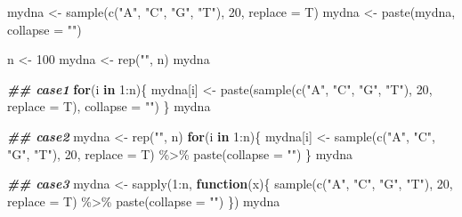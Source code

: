 \documentclass[
]{book}
\newenvironment{Shaded}{\begin{snugshade}}{\end{snugshade}}
\newcommand{\AttributeTok}[1]{\textcolor[rgb]{0.77,0.63,0.00}{#1}}
\newcommand{\ControlFlowTok}[1]{\textcolor[rgb]{0.13,0.29,0.53}{\textbf{#1}}}
\newcommand{\DecValTok}[1]{\textcolor[rgb]{0.00,0.00,0.81}{#1}}
\newcommand{\DocumentationTok}[1]{\textcolor[rgb]{0.56,0.35,0.01}{\textbf{\textit{#1}}}}
\newcommand{\FunctionTok}[1]{\textcolor[rgb]{0.00,0.00,0.00}{#1}}
\newcommand{\NormalTok}[1]{#1}
\newcommand{\OtherTok}[1]{\textcolor[rgb]{0.56,0.35,0.01}{#1}}
\newcommand{\SpecialCharTok}[1]{\textcolor[rgb]{0.00,0.00,0.00}{#1}}
\newcommand{\StringTok}[1]{\textcolor[rgb]{0.31,0.60,0.02}{#1}}
\begin{document}
\begin{Shaded}
\begin{Highlighting}[]

\NormalTok{mydna }\OtherTok{\textless{}{-}} \FunctionTok{sample}\NormalTok{(}\FunctionTok{c}\NormalTok{(}\StringTok{"A"}\NormalTok{, }\StringTok{"C"}\NormalTok{, }\StringTok{"G"}\NormalTok{, }\StringTok{"T"}\NormalTok{), }\DecValTok{20}\NormalTok{, }\AttributeTok{replace =}\NormalTok{ T)}
\NormalTok{mydna }\OtherTok{\textless{}{-}} \FunctionTok{paste}\NormalTok{(mydna, }\AttributeTok{collapse =} \StringTok{""}\NormalTok{)}

\NormalTok{n }\OtherTok{\textless{}{-}} \DecValTok{100}
\NormalTok{mydna }\OtherTok{\textless{}{-}} \FunctionTok{rep}\NormalTok{(}\StringTok{""}\NormalTok{, n) }
\NormalTok{mydna}

\DocumentationTok{\#\# case1}
\ControlFlowTok{for}\NormalTok{(i }\ControlFlowTok{in} \DecValTok{1}\SpecialCharTok{:}\NormalTok{n)\{}
\NormalTok{  mydna[i] }\OtherTok{\textless{}{-}} \FunctionTok{paste}\NormalTok{(}\FunctionTok{sample}\NormalTok{(}\FunctionTok{c}\NormalTok{(}\StringTok{"A"}\NormalTok{, }\StringTok{"C"}\NormalTok{, }\StringTok{"G"}\NormalTok{, }\StringTok{"T"}\NormalTok{), }\DecValTok{20}\NormalTok{, }\AttributeTok{replace =}\NormalTok{ T), }
                    \AttributeTok{collapse =} \StringTok{""}\NormalTok{)}
\NormalTok{\}}
\NormalTok{mydna}

\DocumentationTok{\#\# case2}
\NormalTok{mydna }\OtherTok{\textless{}{-}} \FunctionTok{rep}\NormalTok{(}\StringTok{""}\NormalTok{, n)}
\ControlFlowTok{for}\NormalTok{(i }\ControlFlowTok{in} \DecValTok{1}\SpecialCharTok{:}\NormalTok{n)\{}
\NormalTok{  mydna[i] }\OtherTok{\textless{}{-}} \FunctionTok{sample}\NormalTok{(}\FunctionTok{c}\NormalTok{(}\StringTok{"A"}\NormalTok{, }\StringTok{"C"}\NormalTok{, }\StringTok{"G"}\NormalTok{, }\StringTok{"T"}\NormalTok{), }\DecValTok{20}\NormalTok{, }\AttributeTok{replace =}\NormalTok{ T) }\SpecialCharTok{\%\textgreater{}\%} 
    \FunctionTok{paste}\NormalTok{(}\AttributeTok{collapse =} \StringTok{""}\NormalTok{)}
\NormalTok{\}}
\NormalTok{mydna}

\DocumentationTok{\#\# case3}
\NormalTok{mydna }\OtherTok{\textless{}{-}} \FunctionTok{sapply}\NormalTok{(}\DecValTok{1}\SpecialCharTok{:}\NormalTok{n, }\ControlFlowTok{function}\NormalTok{(x)\{}
  \FunctionTok{sample}\NormalTok{(}\FunctionTok{c}\NormalTok{(}\StringTok{"A"}\NormalTok{, }\StringTok{"C"}\NormalTok{, }\StringTok{"G"}\NormalTok{, }\StringTok{"T"}\NormalTok{), }\DecValTok{20}\NormalTok{, }\AttributeTok{replace =}\NormalTok{ T) }\SpecialCharTok{\%\textgreater{}\%} 
    \FunctionTok{paste}\NormalTok{(}\AttributeTok{collapse =} \StringTok{""}\NormalTok{)}
\NormalTok{\})}
\NormalTok{mydna}


\end{Highlighting}
\end{Shaded}
\end{document}
